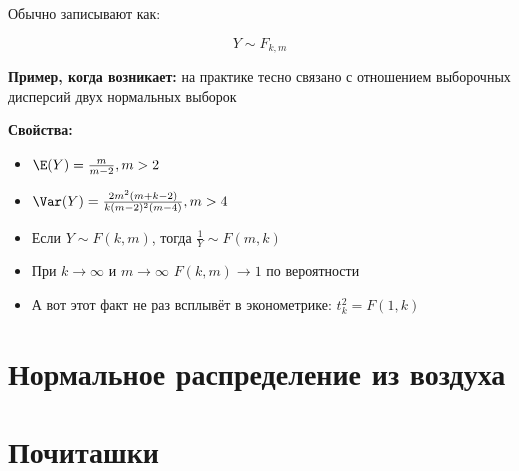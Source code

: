 Обычно записывают как:

$$
Y \sim F_{k,m}
$$   

\textbf{Пример, когда возникает:} на практике тесно связано с отношением выборочных дисперсий двух нормальных выборок

\textbf{Свойства:}

\begin{itemize} 
\item $\E(Y) = \frac{m}{m-2}, m > 2$
\item $\Var(Y) = \frac{2m^2(m + k - 2)}{k (m - 2)^2 (m - 4) }, m > 4$
\item Если $Y \sim F(k,m)$, тогда $\frac{1}{Y} \sim F(m,k)$
\item При $k \to \infty$ и $m \to \infty$ $F(k,m) \to 1$ по вероятности
\item А вот этот факт не раз всплывёт в эконометрике: $t_k^2 = F(1,k)$
\end{itemize} 


\section{Нормальное распределение из воздуха}


\section*{Почиташки} 

